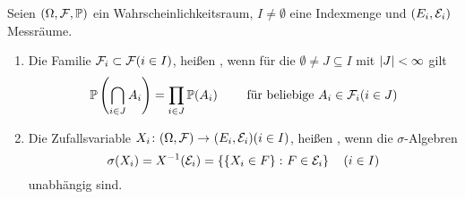 \begin{definition} \label{3_15_def}
	Seien $(\Omega, \mathcal{F},\mathbb{P})$ ein Wahrscheinlichkeitsraum, $I \neq \emptyset$ eine Indexmenge und $(E_i, \mathcal{E}_i)$ Messräume.
	\begin{enumerate}[leftmargin=*]
		\item Die Familie $\mathcal{F}_i \subset \mathcal{F} (i \in I)$, heißen , wenn für die $\emptyset \neq J \subseteq I$ mit $\left| J \right| < \infty$ gilt
		\begin{equation*}
			\mathbb{P}\left( \bigcap_{i \in J} A_i \right) = \prod_{i \in J} \mathbb{P}(A_i) \qquad \text{ für beliebige } A_i \in \mathcal{F}_i (i \in J)
		\end{equation*}
		\item Die Zufallsvariable $\abb{X_i}{(\Omega, \F)}{(E_i, \Ecal_i)} (i \in I)$, heißen , wenn die $\sigma$-Algebren
		\begin{equation*}
			\sigma(X_i) = X^{-1}(\mathcal{E}_i) = \left\{ \left\{ X_i \in F \right\} \colon F \in \mathcal{E}_i \right\} \quad (i \in I)
		\end{equation*}
		unabhängig sind.
	\end{enumerate}
\end{definition}

